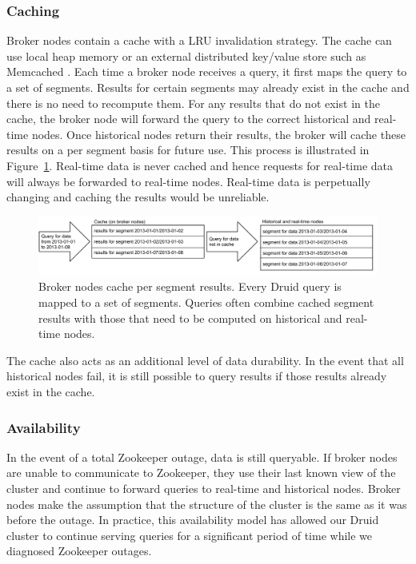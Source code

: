 \documentclass{sig-alternate-2013}
\begin{document}
\subsubsection{Caching}
\label{sec:caching}
Broker nodes contain a cache with a LRU \cite{o1993lru, kim2001lrfu}
invalidation strategy. The cache can use local heap memory or an external
distributed key/value store such as Memcached
\cite{fitzpatrick2004distributed}. Each time a broker node receives a query, it
first maps the query to a set of segments. Results for certain segments may
already exist in the cache and there is no need to recompute them. For any
results that do not exist in the cache, the broker node will forward the query
to the correct historical and real-time nodes.  Once historical nodes return
their results, the broker will cache these results on a per segment basis for
future use. This process is illustrated in Figure~\ref{fig:caching}. Real-time
data is never cached and hence requests for real-time data will always be
forwarded to real-time nodes.  Real-time data is perpetually changing and
caching the results would be unreliable.

\begin{figure}
\centering
\includegraphics[width = 4.5in]{caching}
\caption{Broker nodes cache per segment results. Every Druid query is mapped to
a set of segments. Queries often combine cached segment results with those that
need to be computed on historical and real-time nodes.}
\label{fig:caching}
\end{figure}

The cache also acts as an additional level of data durability. In the event
that all historical nodes fail, it is still possible to query results if those
results already exist in the cache.

\subsubsection{Availability}
In the event of a total Zookeeper outage, data is still queryable.  If broker
nodes are unable to communicate to Zookeeper, they use their last known view of
the cluster and continue to forward queries to real-time and historical nodes.
Broker nodes make the assumption that the structure of the cluster is the same
as it was before the outage. In practice, this availability model has allowed
our Druid cluster to continue serving queries for a significant period of time while we
diagnosed Zookeeper outages. 
\end{document}
